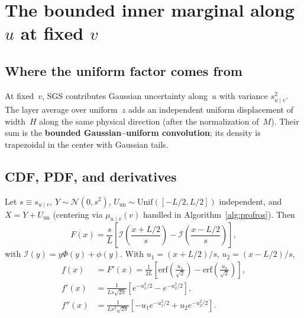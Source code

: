 \documentclass[11pt,a4paper]{article}
\begin{document}
\section{\texorpdfstring{The bounded inner marginal along $u$ at fixed $v$}{Bounded inner marginal along u at fixed v}}
\label{sec:pill-marginal}

\subsection{Where the uniform factor comes from}
At fixed~$v$, SGS contributes Gaussian uncertainty along~$u$ with variance $s_{u\mid v}^2$.
The layer average over uniform~$z$ adds an independent uniform displacement of width~$H$ along the same physical direction (after the normalization of~$M$).
Their sum is the \textbf{bounded Gaussian--uniform convolution}; its density is trapezoidal in the center with Gaussian tails.

\subsection{CDF, PDF, and derivatives}
Let $s\equiv s_{u\mid v}$, $Y\sim\mathcal{N}(0,s^2)$, $U_{\mathrm{un}}\sim\mathrm{Unif}([-L/2,L/2])$ independent, and $X=Y+U_{\mathrm{un}}$ (centering via $\mu_{u\mid v}(v)$ handled in Algorithm~\ref{alg:profros}).
Then
\begin{equation}
\label{eq:pill-cdf}
  F(x) = \frac{s}{L}\left[ \mathcal{I}\!\left(\frac{x+L/2}{s}\right) - \mathcal{I}\!\left(\frac{x-L/2}{s}\right) \right],
\end{equation}
with $\mathcal{I}(y)=y\Phi(y)+\phi(y)$.
With $u_1=(x+L/2)/s$, $u_2=(x-L/2)/s$,
\begin{align}
  f(x) &= F'(x) = \frac{1}{2L}\left[\mathrm{erf}\!\left(\frac{u_1}{\sqrt{2}}\right)-\mathrm{erf}\!\left(\frac{u_2}{\sqrt{2}}\right)\right], \\
  f'(x) &= \frac{1}{Ls\sqrt{2\pi}}\left[e^{-u_1^2/2}-e^{-u_2^2/2}\right], \\
  f''(x) &= \frac{1}{Ls^2\sqrt{2\pi}}\left[-u_1 e^{-u_1^2/2}+u_2 e^{-u_2^2/2}\right].
\end{align}
\end{document}
